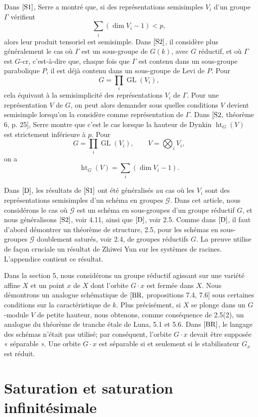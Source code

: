 \documentclass[11pt]{article}
\newcommand{\GL}{\operatorname{GL}}
\newcommand{\htG}{\operatorname{ht}_G}
\begin{document}
Dans \([{\rm S1}]\), Serre a montré que, si des représentations semisimples \(V_i\)
d'un groupe \(\Gamma\) vérifient
\[
  \sum_i(\dim V_i-1)<p,
\]
alors leur produit tensoriel est semisimple. Dans \([{\rm S2}]\), il considère plus
généralement le cas où \(\Gamma\) est un sous-groupe de \(G(k)\), avec \(G\) réductif,
et où \(\Gamma\) est \(G\)-cr, c'est-à-dire que, chaque fois que \(\Gamma\) est contenu
dans un sous-groupe parabolique \(P\), il est déjà contenu dans un sous-groupe de Levi
de \(P\). Pour
\[
  G=\prod_i \GL(V_i),
\]
cela équivaut à la semisimplicité des représentations \(V_i\) de \(\Gamma\). Pour une
représentation \(V\) de \(G\), on peut alors demander sous quelles conditions \(V\)
devient semisimple lorsqu'on la considère comme représentation de \(\Gamma\). Dans
\([{\rm S2},\) théorème 6, p. 25], Serre montre que c'est le cas lorsque la hauteur
de Dynkin \(\htG(V)\) est strictement inférieure à \(p\). Pour
\[
  G=\prod_i \GL(V_i),\qquad V=\bigotimes_i V_i,
\]
on a
\[
  \htG(V)=\sum_i(\dim V_i-1).
\]

Dans \([{\rm D}]\), les résultats de \([{\rm S1}]\) ont été généralisés au cas où les
\(V_i\) sont des représentations semisimples d'un schéma en groupes \(\mathcal G\).
Dans cet article, nous considérons le cas où \(\mathcal G\) est un schéma en
sous-groupes d'un groupe réductif \(G\), et nous généralisons \([{\rm S2}]\), voir
4.11, ainsi que \([{\rm D}]\), voir 2.5. Comme dans \([{\rm D}]\), il faut d'abord
démontrer un théorème de structure, 2.5, pour les schémas en sous-groupes
\(\mathcal G\) doublement saturés, voir 2.4, de groupes réductifs \(G\). La preuve
utilise de façon cruciale un résultat de Zhiwei Yun sur les systèmes de racines.
L'appendice contient ce résultat.

Dans la section 5, nous considérons un groupe réductif agissant sur une variété affine
\(X\) et un point \(x\) de \(X\) dont l'orbite \(G\cdot x\) est fermée dans \(X\). Nous
démontrons un analogue schématique de \([{\rm BR},\) propositions 7.4, 7.6] sous
certaines conditions sur la caractéristique de \(k\). Plus précisément, si \(X\) se plonge
dans un \(G\)-module \(V\) de petite hauteur, nous obtenons, comme conséquence de
2.5(2), un analogue du théorème de tranche étale de Luna, 5.1 et 5.6. Dans
\([{\rm BR}]\), le langage des schémas n'était pas utilisé; par conséquent, l'orbite
\(G\cdot x\) devait être supposée « séparable ». Une orbite \(G\cdot x\) est séparable si
et seulement si le stabilisateur \(G_x\) est réduit.

\section{Saturation et saturation infinitésimale}
\end{document}
